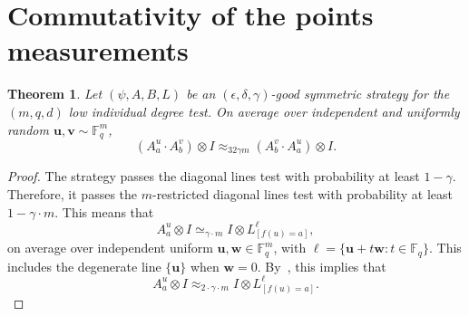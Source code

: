 \documentclass[11pt]{article}
\newtheorem{theorem}{Theorem}[section]
\theoremstyle{definition}
\newcommand{\F}{\mathbb F}
\newcommand{\eps}{\epsilon}
\newcommand{\bell}{\boldsymbol{\ell}}
\newcommand{\bu}{\boldsymbol{u}}
\newcommand{\bv}{\boldsymbol{v}}
\newcommand{\bw}{\boldsymbol{w}}
\begin{document}
\section{Commutativity of the points measurements}
\label{sec:commutativity-points}

\begin{theorem}\label{thm:commutativity-points}
Let $(\psi, A, B, L)$ be an $(\eps, \delta, \gamma)$-good symmetric strategy for the
$(m,q,d)$ low individual degree test.
On average over independent and uniformly random $\bu, \bv \sim \F_q^m$,
\begin{equation*}
(A^{u}_a \cdot A^{v}_b) \otimes I \approx_{32\gamma m} (A^{v}_b\cdot A^{u}_a) \otimes I.
\end{equation*}
\end{theorem}
\begin{proof}
The strategy passes the diagonal lines test with probability at least $1-\gamma$.
Therefore, it passes the $m$-restricted diagonal lines test with probability at least $1- \gamma\cdot m$.
This means that
\begin{equation*}
A^{u}_a \otimes I \simeq_{\gamma \cdot m} I \otimes L^{\ell}_{[f(u)=a]},
\end{equation*}
on average over independent uniform $\bu,\bw\in\F_q^m$, with
$\bell=\{\bu+t\bw:t\in\F_q\}$.  This includes the degenerate line
$\{\bu\}$ when $\bw=0$.
By~, this implies that
\begin{equation}\label{eq:point-diagonal-line-approx}
A^{u}_a \otimes I \approx_{2\cdot \gamma \cdot m} I \otimes L^{\ell}_{[f(u)=a]}.
\end{equation}


\end{proof}
\end{document}
